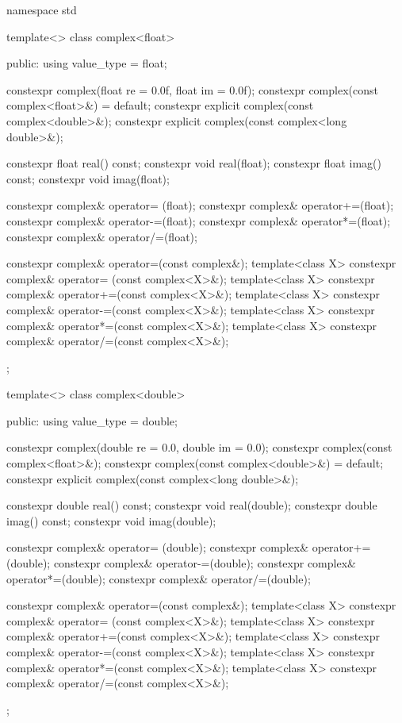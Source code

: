 \begin{codeblock}
namespace std {
  template<> class complex<float> {
  public:
    using value_type = float;

    constexpr complex(float re = 0.0f, float im = 0.0f);
    constexpr complex(const complex<float>&) = default;
    constexpr explicit complex(const complex<double>&);
    constexpr explicit complex(const complex<long double>&);

    constexpr float real() const;
    constexpr void real(float);
    constexpr float imag() const;
    constexpr void imag(float);

    constexpr complex& operator= (float);
    constexpr complex& operator+=(float);
    constexpr complex& operator-=(float);
    constexpr complex& operator*=(float);
    constexpr complex& operator/=(float);

    constexpr complex& operator=(const complex&);
    template<class X> constexpr complex& operator= (const complex<X>&);
    template<class X> constexpr complex& operator+=(const complex<X>&);
    template<class X> constexpr complex& operator-=(const complex<X>&);
    template<class X> constexpr complex& operator*=(const complex<X>&);
    template<class X> constexpr complex& operator/=(const complex<X>&);
  };

  template<> class complex<double> {
  public:
    using value_type = double;

    constexpr complex(double re = 0.0, double im = 0.0);
    constexpr complex(const complex<float>&);
    constexpr complex(const complex<double>&) = default;
    constexpr explicit complex(const complex<long double>&);

    constexpr double real() const;
    constexpr void real(double);
    constexpr double imag() const;
    constexpr void imag(double);

    constexpr complex& operator= (double);
    constexpr complex& operator+=(double);
    constexpr complex& operator-=(double);
    constexpr complex& operator*=(double);
    constexpr complex& operator/=(double);

    constexpr complex& operator=(const complex&);
    template<class X> constexpr complex& operator= (const complex<X>&);
    template<class X> constexpr complex& operator+=(const complex<X>&);
    template<class X> constexpr complex& operator-=(const complex<X>&);
    template<class X> constexpr complex& operator*=(const complex<X>&);
    template<class X> constexpr complex& operator/=(const complex<X>&);
  };

}
\end{codeblock}

